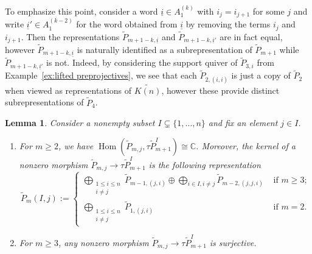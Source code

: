 \documentclass{amsart}
\newtheorem{lemma}[theorem]{Lemma}
\numberwithin{equation}{section}
\newcommand{\CC}{\mathbb{C}}
\newcommand{\ui}{{\underline i}}
\newcommand{\Hom}{\operatorname{Hom}}
\begin{document}
To emphasize this point, consider a word $\ui\in A_1^{(k)}$ with $i_j=i_{j+1}$ for some $j$ and write $\ui'\in A_1^{(k-2)}$ for the word obtained from $\ui$ by removing the terms $i_j$ and $i_{j+1}$.
Then the representations $\tilde P_{m+1-k,\ui}$ and $\tilde P_{m+1-k,\ui'}$ are in fact equal, however $\tilde P_{m+1-k,\ui}$ is naturally identified as a subrepresentation of $\tilde P_{m+1}$ while $\tilde P_{m+1-k,\ui'}$ is not.
Indeed, by considering the support quiver of $\tilde P_{3,i}$ from Example~\ref{ex:lifted preprojectives}, we see that each $\tilde P_{2,(i,i)}$ is just a copy of $\tilde P_2$ when viewed as representations of $\widetilde{K(n)}$, however these provide distinct subrepresentations of $\tilde P_4$.
\begin{lemma}
  \label{le:special subrepresentations}
  Consider a nonempty subset $I\subsetneq\{1,\ldots,n\}$ and fix an element $j\in I$. 
  \begin{enumerate}
    \item For $m\ge2$, we have $\Hom(\tilde P_{m,j},\tau\tilde P_{m+1}^I)\cong\CC$.
      Moreover, the kernel of a nonzero morphism $\tilde P_{m,j}\to\tau\tilde P_{m+1}^I$ is the following representation 
      \[\tilde P_m(I,j):=
        \begin{cases}
          \bigoplus_{\substack{1\leq i\leq n\\i\neq j}}\tilde P_{m-1,(j,i)}\oplus \bigoplus_{i\in I, i\ne j}\tilde P_{m-2,(j,j,i)} & \text{ if $m\geq 3$;}\\
          \bigoplus_{\substack{1\leq i\leq n\\i\neq j}}\tilde P_{1,(j,i)} & \text{ if $m=2$.}
        \end{cases}\]
    \item For $m\ge3$, any nonzero morphism $\tilde P_{m,j}\to\tau\tilde P_{m+1}^I$ is surjective.
  \end{enumerate}
\end{lemma}
\end{document}
